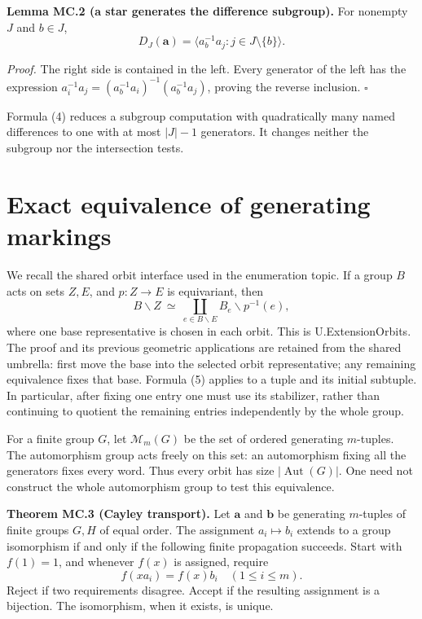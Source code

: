 \documentclass[11pt]{article}
\begin{document}
\textbf{Lemma MC.2 (a star generates the difference subgroup).} For
nonempty \(J\) and \(b\in J\), \[
D_J(\boldsymbol a)=\langle a_b^{-1}a_j:j\in J\setminus\{b\}\rangle.
\tag{4}
\]

\emph{Proof.} The right side is contained in the left. Every generator
of the left has the expression
\(a_i^{-1}a_j=(a_b^{-1}a_i)^{-1}(a_b^{-1}a_j)\), proving the reverse
inclusion. \(\square\)

Formula (4) reduces a subgroup computation with quadratically many named
differences to one with at most \(|J|-1\) generators. It changes neither
the subgroup nor the intersection tests.

\section{Exact equivalence of generating
markings}\label{exact-equivalence-of-generating-markings}

We recall the shared orbit interface used in the enumeration topic. If a
group \(B\) acts on sets \(Z,E\), and \(p:Z\to E\) is equivariant, then
\[
 B\backslash Z\ \simeq\ \coprod_{e\in B\backslash E}B_e\backslash p^{-1}(e),
\tag{5}
\] where one base representative is chosen in each orbit. This is
U.ExtensionOrbits. The proof and its previous geometric applications are
retained from the shared umbrella: first move the base into the selected
orbit representative; any remaining equivalence fixes that base. Formula
(5) applies to a tuple and its initial subtuple. In particular, after
fixing one entry one must use its stabilizer, rather than continuing to
quotient the remaining entries independently by the whole group.

For a finite group \(G\), let \(\mathcal M_m(G)\) be the set of ordered
generating \(m\)-tuples. The automorphism group acts freely on this set:
an automorphism fixing all the generators fixes every word. Thus every
orbit has size \(|\operatorname{Aut}(G)|\). One need not construct the
whole automorphism group to test this equivalence.

\textbf{Theorem MC.3 (Cayley transport).} Let \(\boldsymbol a\) and
\(\boldsymbol b\) be generating \(m\)-tuples of finite groups \(G,H\) of
equal order. The assignment \(a_i\mapsto b_i\) extends to a group
isomorphism if and only if the following finite propagation succeeds.
Start with \(f(1)=1\), and whenever \(f(x)\) is assigned, require \[
f(xa_i)=f(x)b_i\quad(1\leq i\leq m).
\tag{6}
\] Reject if two requirements disagree. Accept if the resulting
assignment is a bijection. The isomorphism, when it exists, is unique.
\end{document}
